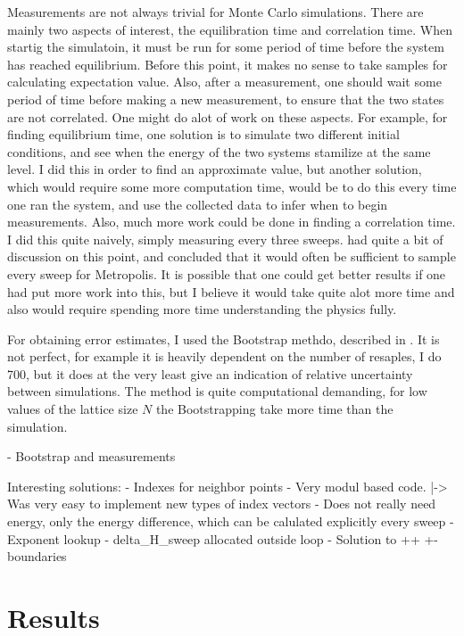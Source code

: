 \documentclass{article}
\begin{document}
Measurements are not always trivial for Monte Carlo simulations.
There are mainly two aspects of interest, the equilibration time and correlation time.
When startig the simulatoin, it must be run for some period of time before the system has reached equilibrium.
Before this point, it makes no sense to take samples for calculating expectation value.
Also, after a measurement, one should wait some period of time before making a new measurement, to ensure that the two states are not correlated.
One might do alot of work on these aspects.
For example, for finding equilibrium time, one solution is to simulate two different initial conditions, and see when the energy of the two systems stamilize at the same level.
I did this in order to find an approximate value, but another solution, which would require some more computation time, would be to do this every time one ran the system, and use the collected data to infer when to begin measurements.
Also, much more work could be done in finding a correlation time.
I did this quite naively, simply measuring every three sweeps.
\cite{niels} had quite a bit of discussion on this point, and concluded that it would often be sufficient to sample every sweep for Metropolis.
It is possible that one could get better results if one had put more work into this, but I believe it would take quite alot more time and also would require spending more time understanding the physics fully.

For obtaining error estimates, I used the Bootstrap methdo, described in \cite{niels}.
It is not perfect, for example it is heavily dependent on the number of resaples, I do 700, but it does at the very least give an indication of relative uncertainty between simulations.
The method is quite computational demanding, for low values of the lattice size $N$ the Bootstrapping take more time than the simulation.


- Bootstrap and measurements

Interesting solutions:
- Indexes for neighbor points
- Very modul based code.
  |-> Was very easy to implement new types of index vectors
- Does not really need energy, only the energy difference, which can be calulated explicitly every sweep
- Exponent lookup
- delta_H_sweep allocated outside loop
- Solution to ++ +- boundaries


\section{Results}
\end{document}
